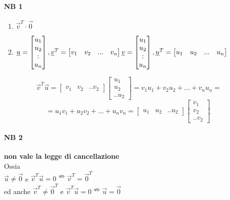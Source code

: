 \paragraph{NB 1}  
\begin{enumerate}
    \item $\vec{v}^T\cdot \vec{0}$
    \item $\vec{u}=
        \begin{bmatrix}
            u_1\\u_2\\: \\u_n
        \end{bmatrix},
        \vec{v}^T=
        \begin{bmatrix}
            v_1 & v_2 & ...& v_n
        \end{bmatrix}\\
        \vec{v}=
        \begin{bmatrix}
            u_1\\u_2\\: \\u_n
        \end{bmatrix},
        \vec{u}^T=
        \begin{bmatrix}
            u_1 & u_2 & ...& u_n
        \end{bmatrix}
        $
\end{enumerate}
{\color{blue}
$$ 
    \vec{v}^T\vec{u}=
    \begin{bmatrix}
        v_1 & v_2 & .. v_2
    \end{bmatrix}
    \begin{bmatrix}
        u_1 \\ u_2 \\ .. u_2
    \end{bmatrix}=
    v_1u_1+v_2u_2+...+v_nu_n=$$
$$
    =u_1v_1+u_2v_2+...+u_nv_n=
    \begin{bmatrix}
        u_1 & u_2 & .. u_2
    \end{bmatrix}
    \begin{bmatrix}
        v_1 \\ v_2 \\ .. v_2
    \end{bmatrix}
    \
$$
}
\paragraph{NB 2} \textbf{non vale la legge di cancellazione}\\
Ossia\\
$\vec{u}\neq\vec{0}$ e $\vec{v}^T\vec{u}=0\nRightarrow\vec{v}^T=\vec{0}^T$\\
ed anche $\vec{v}^T\neq\vec{0}^T$ e $\vec{v}^T\vec{u}=0\nRightarrow\vec{u}=\vec{0}$

